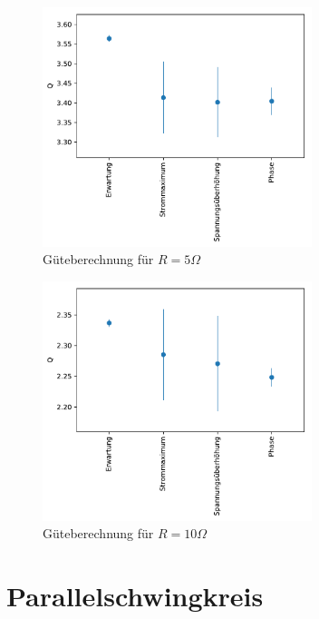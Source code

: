 \documentclass[12pt,a4paper]{article}
\begin{document}
\begin{figure}[H]
	\centering
	\includegraphics[width=0.7\textwidth]{Python/S5_Fazit.pdf}
	\caption{Güteberechnung für $R=5\Omega$}
	\label{S5_Fazit}
\end{figure}
\begin{figure}[H]
	\centering
	\includegraphics[width=0.7\textwidth]{Python/S10_Fazit.pdf}
	\caption{Güteberechnung für $R=10\Omega$}
	\label{S10_Fazit}
\end{figure}


	
\newpage
\section{Parallelschwingkreis}
\end{document}
